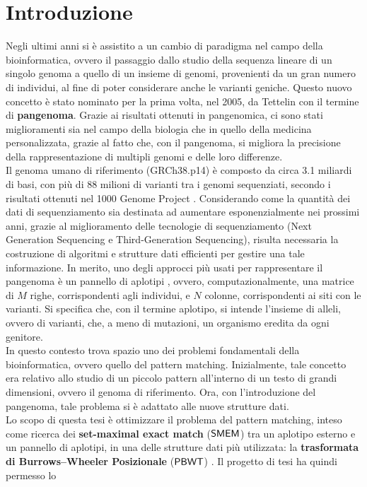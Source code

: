\documentclass[a4paper,12pt, oneside]{book}
\def\PBWT{\mbox{\rm {\sf PBWT}}}
\def\SMEM{\mbox{\rm {\sf SMEM}}}
\begin{document}
\chapter{Introduzione}
Negli ultimi anni si è assistito a un cambio di paradigma nel campo della
bioinformatica, ovvero il passaggio dallo studio della sequenza lineare di un
singolo genoma a quello di un insieme di genomi, provenienti da un gran numero
di individui, al fine di poter considerare anche le varianti
geniche. Questo nuovo concetto è stato nominato per la prima volta, nel 2005,
da Tettelin \cite{tettelin} con il termine di \textbf{pangenoma}. Grazie ai
risultati ottenuti in pangenomica, ci sono stati miglioramenti sia nel 
campo della biologia che in quello della medicina personalizzata, grazie al
fatto che, con il pangenoma, si migliora la precisione della rappresentazione di
multipli genomi e delle loro differenze. \\
Il genoma umano di riferimento (GRCh38.p14) è composto da circa
3.1 miliardi di basi, con più di 88 milioni di
varianti tra i genomi sequenziati, secondo i risultati ottenuti nel 1000 Genome
Project \cite{tutorial}. Considerando come la quantità dei dati di
sequenziamento sia destinata 
ad aumentare esponenzialmente nei prossimi anni, grazie al
miglioramento delle tecnologie di sequenziamento (Next Generation Sequencing e
Third-Generation Sequencing), risulta necessaria la costruzione di algoritmi e
strutture dati efficienti per gestire una tale informazione. 
In merito, uno degli approcci più usati per rappresentare il pangenoma è un
pannello di aplotipi \cite{pancon}, ovvero, computazionalmente, una matrice di
$M$ righe, corrispondenti agli individui, e $N$ colonne, corrispondenti ai siti
con le varianti. Si specifica che, con il termine
aplotipo, si intende l'insieme di alleli, ovvero di varianti, che, a meno di
mutazioni, un organismo eredita da ogni genitore.\\
In questo contesto trova spazio uno dei problemi fondamentali della
bioinformatica, ovvero quello del pattern matching. Inizialmente, tale concetto
era relativo allo studio di un piccolo pattern all'interno di un testo di
grandi dimensioni, ovvero il genoma di riferimento. Ora, con l'introduzione 
del pangenoma, tale problema si è adattato alle nuove strutture
dati.\\
Lo scopo di questa tesi è ottimizzare il problema del pattern 
matching, inteso come ricerca dei \textbf{set-maximal exact match}
  ($\SMEM$) tra un aplotipo 
esterno e un pannello di aplotipi, in una delle 
strutture dati più utilizzata: la \textbf{trasformata di Burrows--Wheeler
  Posizionale} ($\PBWT$) \cite{pbwt}. Il progetto di tesi ha quindi permesso lo
\end{document}
